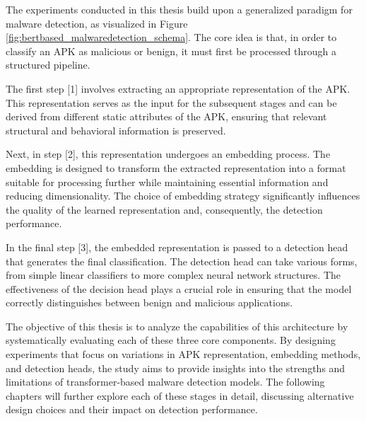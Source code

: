 The experiments conducted in this thesis build upon a generalized paradigm 
for malware detection, as visualized 
in Figure \ref{fig:bertbased_malwaredetection_schema}. 
The core idea is that, in order to classify an APK as malicious or benign, 
it must first be processed through a structured pipeline.

The first step [1] involves extracting an appropriate representation of the APK. 
This representation serves as the input for the subsequent stages 
and can be derived from different static attributes of the APK, 
ensuring that relevant structural and behavioral information is preserved.

Next, in step [2], this representation undergoes an embedding process. 
The embedding is designed to transform the extracted representation into 
a format suitable for processing further while maintaining essential 
information and reducing dimensionality. 
The choice of embedding strategy significantly influences the quality 
of the learned representation and, consequently, the detection performance.

In the final step [3], the embedded representation is passed to a 
detection head that generates the final classification. 
The detection head can take various forms, from simple linear classifiers 
to more complex neural network structures. 
The effectiveness of the decision head plays a crucial role in 
ensuring that the model correctly distinguishes between benign 
and malicious applications.

The objective of this thesis is to analyze the capabilities of 
this architecture by systematically evaluating each of these three 
core components. By designing experiments that focus on variations 
in APK representation, embedding methods, and detection heads, 
the study aims to provide insights into the strengths and limitations 
of transformer-based malware detection models. 
The following chapters will further explore each of these stages in detail, 
discussing alternative design choices and their impact on detection performance.